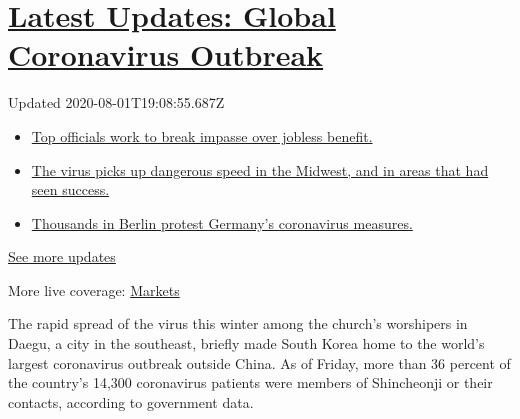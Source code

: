 \hypertarget{latest-updates-global-coronavirus-outbreak}{%
\section{\texorpdfstring{\href{https://www.nytimes3xbfgragh.onion/2020/08/01/world/coronavirus-covid-19.html?action=click\&pgtype=Article\&state=default\&region=MAIN_CONTENT_1\&context=storylines_live_updates}{Latest
Updates: Global Coronavirus
Outbreak}}{Latest Updates: Global Coronavirus Outbreak}}\label{latest-updates-global-coronavirus-outbreak}}

Updated 2020-08-01T19:08:55.687Z

\begin{itemize}
\tightlist
\item
  \href{https://www.nytimes3xbfgragh.onion/2020/08/01/world/coronavirus-covid-19.html?action=click\&pgtype=Article\&state=default\&region=MAIN_CONTENT_1\&context=storylines_live_updates\#link-3ac56579}{Top
  officials work to break impasse over jobless benefit.}
\item
  \href{https://www.nytimes3xbfgragh.onion/2020/08/01/world/coronavirus-covid-19.html?action=click\&pgtype=Article\&state=default\&region=MAIN_CONTENT_1\&context=storylines_live_updates\#link-8796723}{The
  virus picks up dangerous speed in the Midwest, and in areas that had
  seen success.}
\item
  \href{https://www.nytimes3xbfgragh.onion/2020/08/01/world/coronavirus-covid-19.html?action=click\&pgtype=Article\&state=default\&region=MAIN_CONTENT_1\&context=storylines_live_updates\#link-25930521}{Thousands
  in Berlin protest Germany's coronavirus measures.}
\end{itemize}

\href{https://www.nytimes3xbfgragh.onion/2020/08/01/world/coronavirus-covid-19.html?action=click\&pgtype=Article\&state=default\&region=MAIN_CONTENT_1\&context=storylines_live_updates}{See
more updates}

More live coverage:
\href{https://www.nytimes3xbfgragh.onion/live/2020/07/31/business/stock-market-today-coronavirus?action=click\&pgtype=Article\&state=default\&region=MAIN_CONTENT_1\&context=storylines_live_updates}{Markets}

The rapid spread of the virus this winter among the church's worshipers
in Daegu, a city in the southeast, briefly made South Korea home to the
world's largest coronavirus outbreak outside China. As of Friday, more
than 36 percent of the country's 14,300 coronavirus patients were
members of Shincheonji or their contacts, according to government data.

